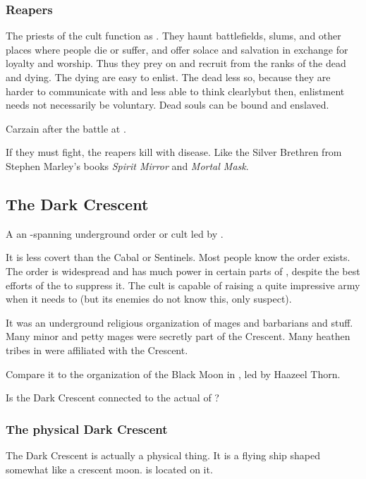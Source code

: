 \subsubsection{Reapers}
The priests of the cult function as . They haunt battlefields, slums,  and other places where people die or suffer, and offer solace and salvation in exchange for loyalty and worship. Thus they prey on and recruit from the ranks of the dead and dying. The dying are easy to enlist. The dead less so, because they are harder to communicate with and less able to think clearly\dash but then, enlistment needs not necessarily be voluntary. Dead souls can be bound and enslaved.

Carzain  after the battle at \Forklin.

If they must fight, the reapers kill with disease. Like the Silver Brethren from Stephen Marley's books \emph{Spirit Mirror} and \emph{Mortal Mask}. 









\subsection{The Dark Crescent}
A an \Azmith-spanning underground order or cult led by \LocarPsyrex. 

It is less covert than the Cabal or Sentinels. 
Most people know the order exists. 
The order is widespread and has much power in certain parts of \Velcad{}, despite the best efforts of the  to suppress it. 
The cult is capable of raising a quite impressive army when it needs to (but its enemies do not know this, only suspect). 

It was an underground religious organization of mages and barbarians and stuff.
Many minor \rethyaxes and petty mages were secretly part of the Crescent.
Many heathen tribes in \Velcad were affiliated with the Crescent.

Compare it to the organization of the Black Moon in \FLuneNoire, led by Haazeel Thorn. 

Is the Dark Crescent connected to the actual  of \Miith{}? 





\subsubsection{The physical Dark Crescent}
The Dark Crescent is actually a physical thing. It is a flying ship shaped somewhat like a crescent moon.  is located on it. 

